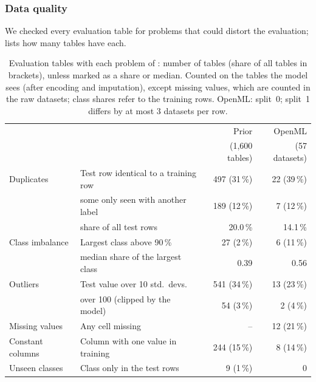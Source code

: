 \subsubsection{Data quality}\label{sec:data_quality}

We checked every evaluation table for problems that could distort the
evaluation;  lists how many tables have each.

\begin{table}[!ht]
  \centering
  \small
  \setlength{\tabcolsep}{4.5pt}  %
  \begin{tabular}{llrr}
    \toprule
    & & Prior & OpenML \\
    & & (1{,}600 tables) & (57 datasets) \\
    \midrule
    Duplicates & Test row identical to a training row & 497 (31\,\%) & 22 (39\,\%) \\
    & \quad some only seen with another label & 189 (12\,\%) & 7 (12\,\%) \\
    & \quad share of all test rows & 20.0\,\% & 14.1\,\% \\
    \midrule
    Class imbalance & Largest class above 90\,\% & 27 (2\,\%) & 6 (11\,\%) \\
    & \quad median share of the largest class & 0.39 & 0.56 \\
    \midrule
    Outliers & Test value over 10 std.\ devs. & 541 (34\,\%) & 13 (23\,\%) \\
    & \quad over 100 (clipped by the model) & 54 (3\,\%) & 2 (4\,\%) \\
    \midrule
    Missing values & Any cell missing & -- & 12 (21\,\%) \\
    \midrule
    Constant columns & Column with one value in training & 244 (15\,\%) & 8 (14\,\%) \\
    \midrule
    Unseen classes & Class only in the test rows & 9 (1\,\%) & 0 \\
    \bottomrule
  \end{tabular}
  \caption{Evaluation tables with each problem of :
    number of tables (share of all tables in brackets), unless marked as a
    share or median.
    Counted on the tables the model sees (after encoding and imputation),
    except missing values, which are counted in the raw datasets; class
    shares refer to the training rows. OpenML: split~0; split~1 differs by
    at most 3 datasets per row.}
  \label{tab:quality}
\end{table}

